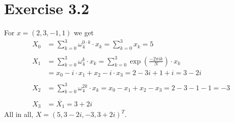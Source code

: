 \documentclass[12pt]{article}
\begin{document}
\section*{Exercise 3.2}
For $x=(2,3,-1,1)$ we get
\begin{align*}
    X_0 &= \sum_{k=0}^3 \omega_4^{0\cdot k} \cdot x_k
    = \sum_{k=0}^3 x_k = 5 \\ \\
    X_1 &= \sum_{k=0}^3 \omega_4^k\cdot x_k
    = \sum_{k=0}^3 \exp\left(\frac{-2\pi i k}{N}\right)\cdot x_k \\
    &= x_0 - i\cdot x_1 + x_2 - i\cdot x_3
    = 2 - 3i + 1 + i = 3 - 2i \\ \\
    X_2 &= \sum_{k=0}^3 \omega_4^{2k}\cdot x_k
    = x_0 - x_1 + x_2 - x_3 = 2-3-1-1 = -3 \\ \\
    X_3 &= \overline{X_1} = 3 + 2i
\end{align*}
All in all, $X = (5, 3-2i, -3, 3+2i)^T.$
\end{document}

